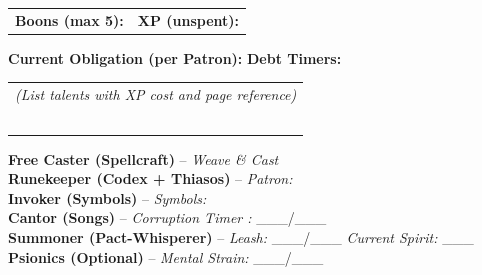 \begin{tcolorbox}[
    enhanced, sharp corners, 
    colback=white, colframe=black!50, 
    title={\large\bfseries Resources}, 
    fonttitle=\bfseries,
    breakable
]
\begin{tabular}{p{}p{}}
\textbf{Boons (max 5):} \hrulefill & \textbf{XP (unspent):} \hrulefill \\
\end{tabular}
\vspace{4pt}
\textbf{Current Obligation (per Patron):} \hrulefill
\vspace{4pt}
\textbf{Debt Timers:} \hrulefill
\end{tcolorbox}

\begin{tcolorbox}[
    enhanced, sharp corners, 
    colback=white, colframe=black!50, 
    title={\large\bfseries Talents \& Abilities}, 
    fonttitle=\bfseries,
    breakable
]
\vspace{2pt}
\begin{tabular}{p{\textwidth}}
\small
\emph{(List talents with XP cost and page reference)} \\
\rule{0pt}{4ex}\\
\rule{0pt}{4ex}\\
\rule{0pt}{4ex}\\
\rule{0pt}{4ex}\\
\rule{0pt}{4ex}\\
\end{tabular}
\end{tcolorbox}

\clearpage
\thispagestyle{empty}


\begin{tcolorbox}[
    enhanced, sharp corners, 
    colback=white, colframe=black!50, 
    title={\large\bfseries Magic Paths}, 
    fonttitle=\bfseries,
    breakable
]
\small
\noindent\textbf{Free Caster (Spellcraft)} -- \emph{Weave \& Cast} \hrulefill\\
\textbf{Runekeeper (Codex + Thiasos)} -- \emph{Patron:} \hrulefill\\
\textbf{Invoker (Symbols)} -- \emph{Symbols:} \hrulefill\\
\textbf{Cantor (Songs)} -- \emph{Corruption Timer :} \_\_\_/\_\_\_\\
\textbf{Summoner (Pact-Whisperer)} -- \emph{Leash:} \_\_\_/\_\_\_ \quad \emph{Current Spirit:} \_\_\_\\
\textbf{Psionics (Optional)} -- \emph{Mental Strain:} \_\_\_/\_\_\_\\
\end{tcolorbox}

